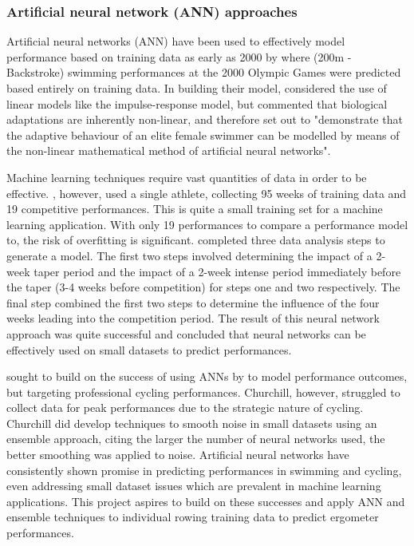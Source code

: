 \subsubsection{Artificial neural network (ANN) approaches}
Artificial neural networks (ANN) have been used to effectively model performance based on training data as early as 2000 by \textcite{Edelmannnusser2002} where (200m - Backstroke) swimming performances at the 2000 Olympic Games were predicted based entirely on training data. In building their model, \textcite{Edelmannnusser2002} considered the use of linear models like the impulse-response model, but commented that biological adaptations are inherently non-linear, and therefore set out to "demonstrate that the adaptive behaviour of an elite female swimmer can be modelled by means of the non-linear mathematical method of artificial neural networks". 

Machine learning techniques require vast quantities of data in order to be effective. \textcite{Edelmannnusser2002}, however, used a single athlete, collecting 95 weeks of training data and 19 competitive performances. This is quite a small training set for a machine learning application. With only 19 performances to compare a performance model to, the risk of overfitting is significant. \textcite{Edelmannnusser2002} completed three data analysis steps to generate a model. The first two steps involved determining the impact of a 2-week taper period and the impact of a 2-week intense period immediately before the taper (3-4 weeks before competition) for steps one and two respectively. The final step combined the first two steps to determine the influence of the four weeks leading into the competition period. The result of this neural network approach was quite successful and \textcite{Edelmannnusser2002} concluded that neural networks can be effectively used on small datasets to predict performances. 

\textcite{Churchill2014} sought to build on the success of using ANNs by \textcite{Edelmannnusser2002} to model performance outcomes, but targeting professional cycling performances. Churchill, however, struggled to collect data for peak performances due to the strategic nature of cycling. Churchill did develop techniques to smooth noise in small datasets using an ensemble approach, citing the larger the number of neural networks used, the better smoothing was applied to noise. Artificial neural networks have consistently shown promise in predicting performances in swimming and cycling, even addressing small dataset issues which are prevalent in machine learning applications. This project aspires to build on these successes and apply ANN and ensemble techniques to individual rowing training data to predict ergometer performances.
